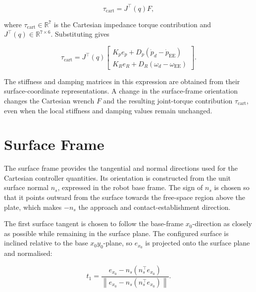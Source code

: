 \begin{equation}
\tau_{\mathrm{cart}}
=
J^\top(q)F,
\label{eq:joint_torque_mapping}
\end{equation}

where \mbox{\(\tau_{\mathrm{cart}}\in\mathbb{R}^7\)} is the Cartesian impedance
torque contribution and
\mbox{\(J^\top(q)\in\mathbb{R}^{7\times6}\)}. Substituting
\mbox{} gives

\begin{equation}
\tau_{\mathrm{cart}}
=
J^\top(q)
\begin{bmatrix}
K_pe_p
+
D_p\left(\dot{p}_d-\dot{p}_{\mathrm{EE}}\right)
\\[1mm]
K_Re_R
+
D_R\left(\omega_d-\omega_{\mathrm{EE}}\right)
\end{bmatrix}.
\label{eq:cartesian_impedance_control_law}
\end{equation}

The stiffness and damping matrices in this expression are obtained from their
surface-coordinate representations. A change in the surface-frame
orientation changes the Cartesian wrench \mbox{\(F\)} and the
resulting joint-torque contribution \mbox{\(\tau_{\mathrm{cart}}\)}, even when
the local stiffness and damping values remain unchanged.

\section{Surface Frame}
\label{subsec:surface_task_frame}

The surface frame provides the tangential and normal directions used for the
Cartesian controller quantities. Its orientation is constructed from the unit
surface normal \mbox{\(n_s\)}, expressed in the robot base frame. The sign of
\mbox{\(n_s\)} is chosen so that it points outward from the surface towards the
free-space region above the plate, which makes \mbox{\(-n_s\)} the approach and
contact-establishment direction.

The first surface tangent is chosen to follow the base-frame
\mbox{\(x_0\)}-direction as closely as possible while remaining in the surface
plane. The configured surface is inclined relative to the base
\mbox{\(x_0y_0\)}-plane, so \mbox{\(e_{x_0}\)} is projected onto the surface plane
and normalised:

\begin{equation}
t_1
=
\frac{e_{x_0}-n_s\left(n_s^\top e_{x_0}\right)}
{\left\|e_{x_0}-n_s\left(n_s^\top e_{x_0}\right)\right\|}.
\label{eq:surface_frame_tangents}
\end{equation}

